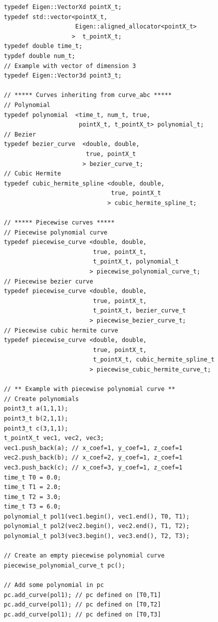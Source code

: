 \documentclass{article}
\begin{document}
    \begin{lstlisting}
    typedef Eigen::VectorXd pointX_t;
    typedef std::vector<pointX_t,
                        Eigen::aligned_allocator<pointX_t> 
                       >  t_pointX_t;
    typedef double time_t;
    typdef double num_t;
    // Example with vector of dimension 3
    typedef Eigen::Vector3d point3_t;
    
    // ***** Curves inheriting from curve_abc *****
    // Polynomial
    typedef polynomial  <time_t, num_t, true, 
                         pointX_t, t_pointX_t> polynomial_t;
    // Bezier
    typedef bezier_curve  <double, double, 
                           true, pointX_t
                          > bezier_curve_t;
    // Cubic Hermite
    typedef cubic_hermite_spline <double, double, 
                                  true, pointX_t
                                 > cubic_hermite_spline_t;
    
    // ***** Piecewise curves *****
    // Piecewise polynomial curve
    typedef piecewise_curve <double, double, 
                             true, pointX_t, 
                             t_pointX_t, polynomial_t
                            > piecewise_polynomial_curve_t;
    // Piecewise bezier curve
    typedef piecewise_curve <double, double, 
                             true, pointX_t, 
                             t_pointX_t, bezier_curve_t
                            > piecewise_bezier_curve_t;
    // Piecewise cubic hermite curve
    typedef piecewise_curve <double, double, 
                             true, pointX_t, 
                             t_pointX_t, cubic_hermite_spline_t
                            > piecewise_cubic_hermite_curve_t;
                            
    // ** Example with piecewise polynomial curve **
    // Create polynomials
    point3_t a(1,1,1);
    point3_t b(2,1,1);
    point3_t c(3,1,1);
    t_pointX_t vec1, vec2, vec3;
    vec1.push_back(a); // x_coef=1, y_coef=1, z_coef=1
    vec2.push_back(b); // x_coef=2, y_coef=1, z_coef=1
    vec3.push_back(c); // x_coef=3, y_coef=1, z_coef=1
    time_t T0 = 0.0;
    time_t T1 = 2.0;
    time_t T2 = 3.0;
    time_t T3 = 6.0;
    polynomial_t pol1(vec1.begin(), vec1.end(), T0, T1);
    polynomial_t pol2(vec2.begin(), vec2.end(), T1, T2);
    polynomial_t pol3(vec3.begin(), vec3.end(), T2, T3);
    
    // Create an empty piecewise polynomial curve
    piecewise_polynomial_curve_t pc();
    
    // Add some polynomial in pc
    pc.add_curve(pol1); // pc defined on [T0,T1]
    pc.add_curve(pol1); // pc defined on [T0,T2]
    pc.add_curve(pol1); // pc defined on [T0,T3]
    

\end{lstlisting}
\end{document}
